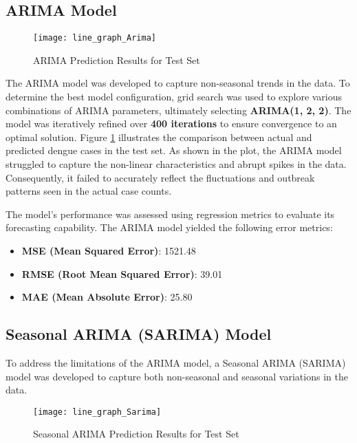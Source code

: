 \subsection{ARIMA Model}



\begin{figure}[H]
	\centering
	\texttt{[image: line\_graph\_Arima]}
	\caption{ARIMA Prediction Results for Test Set}
	\label{fig:Arima_result}
\end{figure}

The ARIMA model was developed to capture non-seasonal trends in the data. To determine the best model configuration, grid search was used to explore various combinations of ARIMA parameters, ultimately selecting \textbf{ARIMA(1, 2, 2)}. The model was iteratively refined over \textbf{400 iterations} to ensure convergence to an optimal solution. Figure \ref{fig:Arima_result} illustrates the comparison between actual and predicted dengue cases in the test set. As shown in the plot, the ARIMA model struggled to capture the non-linear characteristics and abrupt spikes in the data. Consequently, it failed to accurately reflect the fluctuations and outbreak patterns seen in the actual case counts.

The model's performance was assessed using regression metrics to evaluate its forecasting capability. The ARIMA model yielded the following error metrics:

\begin{itemize}
	\item \textbf{MSE (Mean Squared Error)}: 1521.48
	\item \textbf{RMSE (Root Mean Squared Error)}: 39.01
	\item \textbf{MAE (Mean Absolute Error)}: 25.80
\end{itemize}

\subsection{Seasonal ARIMA (SARIMA) Model}

To address the limitations of the ARIMA model, a Seasonal ARIMA (SARIMA) model was developed to capture both non-seasonal and seasonal variations in the data.

\begin{figure}[H]
	\centering
	\texttt{[image: line\_graph\_Sarima]}
	\caption{Seasonal ARIMA Prediction Results for Test Set}
	\label{fig:Sarima_result}
\end{figure}

